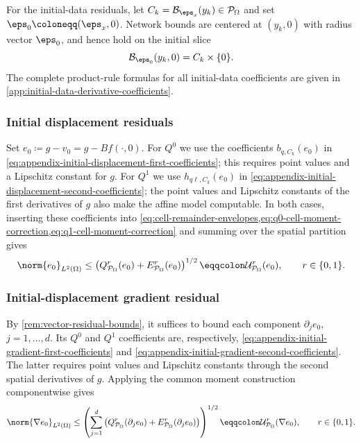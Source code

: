 For the initial-data residuals, let
$C_k=\mathcal B_{\boldsymbol{\eps}_x}(y_k)\in\mathcal P_\Omega$ and set
$\boldsymbol{\eps}_0\coloneqq(\boldsymbol{\eps}_x,0)$.  Network bounds are
centered at $(y_k,0)$ with radius vector $\boldsymbol{\eps}_0$, and hence hold
on the initial slice
\[
 \mathcal B_{\boldsymbol{\eps}_0}(y_k,0)
 =C_k\times\{0\}.
\]
The complete product-rule formulas for all initial-data coefficients are
given in \cref{app:initial-data-derivative-coefficients}.

\subsubsection{Initial displacement residuals}\label{sec:initial-displacement-quad}

Set $e_0\coloneqq g-v_0=g-Bf(\cdot,0)$.  For $Q^0$ we use the coefficients
$b_{q,C_k}(e_0)$ in
\eqref{eq:appendix-initial-displacement-first-coefficients}; this requires
point values and a Lipschitz constant for $g$.  For $Q^1$ we use
$h_{q\ell,C_k}(e_0)$ in
\eqref{eq:appendix-initial-displacement-second-coefficients}; the point values
and Lipschitz constants of the first derivatives of $g$ also make the affine
model computable.  In both cases, inserting these coefficients into
\cref{eq:cell-remainder-envelopes,eq:q0-cell-moment-correction,eq:q1-cell-moment-correction}
and summing over the spatial partition gives
\begin{equation}\label{eq:initial-displacement-global-bound}
    \norm{e_0}_{L^2(\Omega)}
    \leq
    \left(
        Q_{\mathcal P_\Omega}^r(e_0)
        +E_{\mathcal P_\Omega}^r(e_0)
    \right)^{1/2}
    \eqqcolon \mathcal{U}^r_{\mathcal{P}_\Omega}(e_0),
    \qquad r\in\{0,1\}.
\end{equation}

\subsubsection{Initial-displacement gradient residual}\label{sec:initial-displacement-gradient-quad}

By \cref{rem:vector-residual-bounds}, it suffices to bound each
component $\partial_j e_0$, $j=1,\dots,d$.  Its $Q^0$ and $Q^1$
coefficients are, respectively,
\eqref{eq:appendix-initial-gradient-first-coefficients} and
\eqref{eq:appendix-initial-gradient-second-coefficients}.  The latter requires
point values and Lipschitz constants through the second spatial derivatives
of $g$.  Applying the common moment construction componentwise gives
\begin{equation}\label{eq:initial-gradient-global-bound}
    \norm{\nabla e_0}_{L^2(\Omega)}
    \leq
    \left(
        \sum_{j=1}^d
        \left(Q_{\mathcal P_\Omega}^r(\partial_j e_0)
        +E_{\mathcal P_\Omega}^r(\partial_j e_0)\right)
    \right)^{1/2}
    \eqqcolon \mathcal U_{\mathcal P_\Omega}^r(\nabla e_0),
    \qquad r\in\{0,1\}.
\end{equation}


